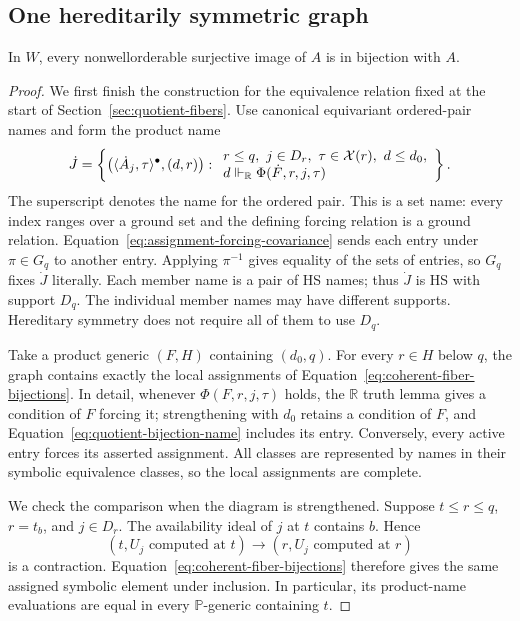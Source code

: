\subsection{One hereditarily symmetric graph}

\begin{theorem}\label{thm:quotient-classification}
In $W$, every nonwellorderable surjective image of $A$ is in bijection
with $A$.
\end{theorem}
\begin{proof}
We first finish the construction for the equivalence relation fixed
at the start of Section~\ref{sec:quotient-fibers}. Use canonical
equivariant ordered-pair names and form the product name
\begin{equation}\label{eq:quotient-bijection-name}
 \dot J=
 \left\{
 \left(\langle\dot A_j,\tau\rangle^{\bullet},(d,r)\right):
 \begin{array}{l}
 r\le q,\ j\in D_r,\ \tau\in\mathcal X(r),\ d\le d_0,\\
 d\Vdash_{\mathbb R}\Phi(\dot F,r,j,\tau)
 \end{array}\right\}.
\end{equation}
The superscript denotes the name for the ordered pair. This is a set
name: every index ranges over a ground set and the defining forcing
relation is a ground relation. Equation~\eqref{eq:assignment-forcing-covariance}
sends each entry under $\pi\in G_q$ to another entry. Applying
$\pi^{-1}$ gives equality of the sets of entries, so $G_q$ fixes
$\dot J$ literally. Each member name is a pair of HS names; thus
$\dot J$ is HS with support $D_q$. The individual member names may
have different supports. Hereditary symmetry does not require all of
them to use $D_q$.

Take a product generic $(F,H)$ containing $(d_0,q)$. For every
$r\in H$ below $q$, the graph contains exactly the local assignments
of Equation~\eqref{eq:coherent-fiber-bijections}. In detail, whenever
$\Phi(F,r,j,\tau)$ holds, the $\mathbb R$ truth lemma gives a
condition of $F$ forcing it; strengthening with $d_0$ retains a
condition of $F$, and Equation~\eqref{eq:quotient-bijection-name}
includes its entry. Conversely, every active entry forces its
asserted assignment. All classes are represented by names in their
symbolic equivalence classes, so the local assignments are complete.

We check the comparison when the diagram is strengthened. Suppose
$t\le r\le q$, $r=t_b$, and $j\in D_r$. The availability ideal
of $j$ at $t$ contains $b$. Hence
\[
 (t,U_j\text{ computed at }t)
        \longrightarrow(r,U_j\text{ computed at }r)
\]
is a contraction. Equation~\eqref{eq:coherent-fiber-bijections}
therefore gives the same assigned symbolic element under inclusion.
In particular, its product-name evaluations are equal in every
$\mathbb P$-generic containing $t$.


\end{proof}
